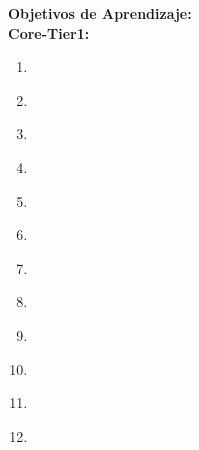 \noindent \textbf{Objetivos de Aprendizaje:}\\
\noindent \textbf{Core-Tier1:}
\begin{enumerate}
	\setcounter{enumi}{0}
	\item \SDFDevelopmentMethodsLOTraceThe\xspace[\SDFDevelopmentMethodsLOTraceTheLevel]\label{sec:BOK:SDFDevelopmentMethodsLOTraceThe}
	\item \SDFDevelopmentMethodsLOExplainWhyOf\xspace[\SDFDevelopmentMethodsLOExplainWhyOfLevel]\label{sec:BOK:SDFDevelopmentMethodsLOExplainWhyOf}
	\item \SDFDevelopmentMethodsLOIdentifyCommonThat\xspace[\SDFDevelopmentMethodsLOIdentifyCommonThatLevel]\label{sec:BOK:SDFDevelopmentMethodsLOIdentifyCommonThat}
	\item \SDFDevelopmentMethodsLOConductAReview\xspace[\SDFDevelopmentMethodsLOConductAReviewLevel]\label{sec:BOK:SDFDevelopmentMethodsLOConductAReview}
	\item \SDFDevelopmentMethodsLOContribute\xspace[\SDFDevelopmentMethodsLOContributeLevel]\label{sec:BOK:SDFDevelopmentMethodsLOContribute}
	\item \SDFDevelopmentMethodsLODescribeHowCanTo\xspace[\SDFDevelopmentMethodsLODescribeHowCanToLevel]\label{sec:BOK:SDFDevelopmentMethodsLODescribeHowCanTo}
	\item \SDFDevelopmentMethodsLORefactor\xspace[\SDFDevelopmentMethodsLORefactorLevel]\label{sec:BOK:SDFDevelopmentMethodsLORefactor}
	\item \SDFDevelopmentMethodsLOApplyAStrategies\xspace[\SDFDevelopmentMethodsLOApplyAStrategiesLevel]\label{sec:BOK:SDFDevelopmentMethodsLOApplyAStrategies}
	\item \SDFDevelopmentMethodsLOConstructExecute\xspace[\SDFDevelopmentMethodsLOConstructExecuteLevel]\label{sec:BOK:SDFDevelopmentMethodsLOConstructExecute}
	\item \SDFDevelopmentMethodsLOConstructAnd\xspace[\SDFDevelopmentMethodsLOConstructAndLevel]\label{sec:BOK:SDFDevelopmentMethodsLOConstructAnd}
	\item \SDFDevelopmentMethodsLOAnalyzeTheWhich\xspace[\SDFDevelopmentMethodsLOAnalyzeTheWhichLevel]\label{sec:BOK:SDFDevelopmentMethodsLOAnalyzeTheWhich}
	\item \SDFDevelopmentMethodsLOApplyConsistent\xspace[\SDFDevelopmentMethodsLOApplyConsistentLevel]\label{sec:BOK:SDFDevelopmentMethodsLOApplyConsistent}
\end{enumerate}





